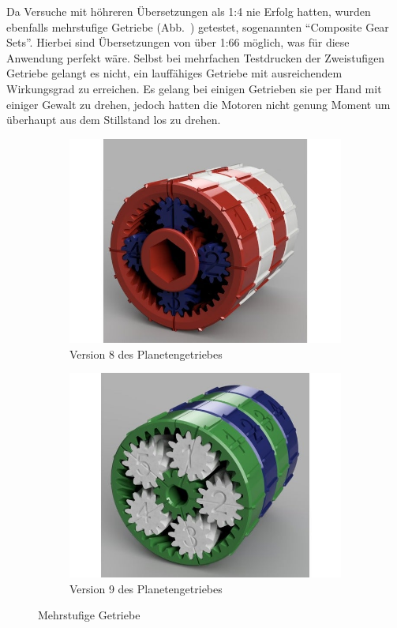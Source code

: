 Da Versuche mit höhreren Übersetzungen als 1:4 nie Erfolg hatten, wurden ebenfalls mehrstufige Getriebe (Abb.~\label{bild:compgetr}) getestet, sogenannten ``Composite Gear Sets''.
Hierbei sind Übersetzungen von über 1:66 möglich, was für diese Anwendung perfekt wäre. 
Selbst bei mehrfachen Testdrucken der Zweistufigen Getriebe gelangt es nicht, ein lauffähiges Getriebe mit ausreichendem Wirkungsgrad zu erreichen.
Es gelang bei einigen Getrieben sie per Hand mit einiger Gewalt zu drehen, jedoch hatten die Motoren nicht genung Moment um überhaupt aus dem Stillstand los zu drehen.

\begin{figure}[!ht]
	\centering
	\begin{subfigure}[b]{0.4\textwidth}
		\includegraphics[width=\textwidth]{bilder/GetriebeVersion5-1.jpg}
		\caption{Version 8 des Planetengetriebes \cite{link:planetgear5-1}}
		\label{bild:gearversion5-1}
	\end{subfigure}
	\hspace{0.1\textwidth}%
	\begin{subfigure}[b]{0.4\textwidth}
		\includegraphics[width=\textwidth]{bilder/GetriebeVersion5-2.jpg}
		\caption{Version 9 des Planetengetriebes \cite{link:planetgear5-2}}
		\label{bild:gearversion5-2}
	\end{subfigure}
	\caption{Mehrstufige Getriebe}
	\label{bild:compgetr}
\end{figure}

